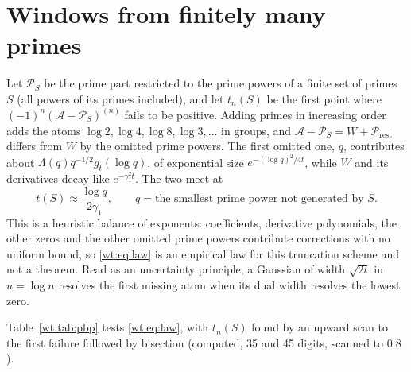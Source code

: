 \section{Windows from finitely many primes}\label{wt:sec:work}

\begin{resultpar}\label{wt:res:law}
Let $\mathcal P_S$ be the prime part restricted to the prime powers of a finite set of primes $S$ (all powers of its primes included), and let $t_n(S)$ be the first point where $(-1)^n(\mathcal A-\mathcal P_S)^{(n)}$ fails to be positive. Adding primes in increasing order adds the atoms $\log2,\log4,\log8,\log3,\dots$ in groups, and $\mathcal A-\mathcal P_S=W+\mathcal P_{\mathrm{rest}}$ differs from $W$ by the omitted prime powers. The first omitted one, $q$, contributes about $\Lambda(q)q^{-1/2}g_t(\log q)$, of exponential size $e^{-(\log q)^2/4t}$, while $W$ and its derivatives decay like $e^{-\gamma_1^2t}$. The two meet at
\begin{equation}\label{wt:eq:law}
t(S)\approx\frac{\log q}{2\gamma_1},\qquad q=\text{the smallest prime power not generated by }S.
\end{equation}
This is a heuristic balance of exponents: coefficients, derivative polynomials, the other zeros and the other omitted prime powers contribute corrections with no uniform bound, so \eqref{wt:eq:law} is an empirical law for this truncation scheme and not a theorem. Read as an uncertainty principle, a Gaussian of width $\sqrt{2t}$ in $u=\log n$ resolves the first missing atom when its dual width resolves the lowest zero.\end{resultpar}

Table~\ref{wt:tab:pbp} tests \eqref{wt:eq:law}, with $t_n(S)$ found by an upward scan to the first failure followed by bisection (computed, 35 and 45 digits, scanned to $0.8$).

\begin{table}[h]\centering\small
{}
\caption{End of the positivity window of order $n$ when only the primes in $S$ are kept (computed). The entries $>0.8$ mean no failure up to the end of the scan.}\label{wt:tab:pbp}
\end{table}

